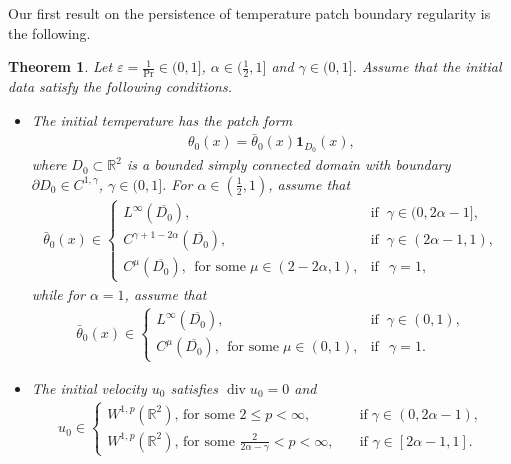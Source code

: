 \documentclass[reqno,11pt,a4paper]{amsart}
\newtheorem{theorem}{Theorem}[section]
\begin{document}
Our first result on the persistence of temperature patch
boundary regularity is the following.
\begin{theorem}\label{thm:C1}
Let $\varepsilon =\frac{1}{\mathrm{Pr}} \in (0,1]$, $\alpha\in (\frac{1}{2},1]$ and $\gamma\in(0,1]$.
Assume that the initial data satisfy the following conditions.
\begin{itemize}
\item 
The initial temperature has the patch form
\begin{align}\label{eq:the-data-patch}
  \theta_0(x) = \bar{\theta}_0(x) \mathbf{1}_{D_0}(x),
\end{align}
where 
$D_0\subset \mathbb{R}^2$ is a bounded simply connected domain with boundary 
$\partial D_0\in C^{1,\gamma}$, $\gamma\in(0,1]$. 
For $\alpha\in(\frac{1}{2},1)$, assume that
\begin{align*}
  \bar{\theta}_0(x) \in
  \begin{cases}
    L^\infty(\overline{D_0}),\quad & \textrm{if}\;\;\gamma\in(0,2\alpha-1],\\
    C^{\gamma+1-2\alpha}(\overline{D_0}),
    & \textrm{if}\;\;  \gamma\in(2\alpha-1,1),\\
    C^{\mu}(\overline{D_0}),\,\;\textrm{for some}\;\mu \in (2-2\alpha,1),
    & \textrm{if}\;\; \,\gamma=1,
  \end{cases}
\end{align*}
while for $\alpha=1$, assume that
\begin{align*}
  \bar{\theta}_0(x) \in
  \begin{cases}
    L^\infty(\overline{D_0}),\quad & \textrm{if}\;\;\gamma\in(0,1),\\
    C^{\mu}(\overline{D_0}),\,\;\textrm{for some}\;\mu \in (0,1),
    & \textrm{if}\;\; \,\gamma=1.
  \end{cases}
\end{align*}
\item 
The initial velocity $u_0$ satisfies $\operatorname{div}u_0=0$ and
\begin{align*}
   u_0\in 
   \begin{cases}
    W^{1,p}(\mathbb{R}^2), \, \textrm{for some}\,\,2\leq p<\infty,
      \quad & \textrm{if}\;\gamma\in(0,2\alpha-1), \\
     W^{1,p}(\mathbb{R}^2), \, \textrm{for some}\,\,\frac{2}{2\alpha-\gamma}<p<\infty,
     \quad & \textrm{if}\,\,\gamma\in[2\alpha-1,1].
   \end{cases}
 \end{align*}
\end{itemize}

\end{theorem}
\end{document}
